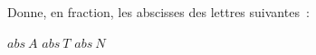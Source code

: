 %
%
Donne, en fraction, les abscisses des lettres suivantes~:
  \begin{tasks}
    \task $abs~A$
    \task $abs~T$
    \task $abs~N$
  \end{tasks}
